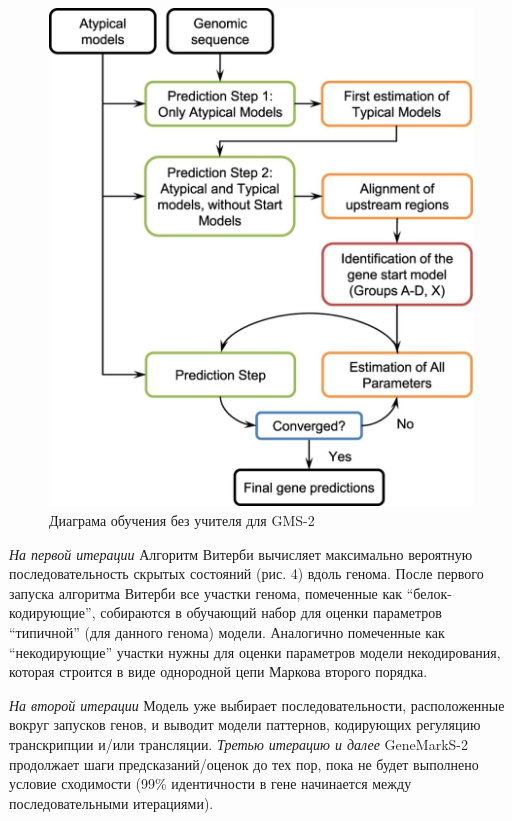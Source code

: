 \documentclass[14pt]{extarticle}
\begin{document}
    \begin{figure}[]
            \centering
            \includegraphics[width=\textwidth]{img/gms2_2.jpg}
            \caption{Диаграма обучения без учителя для GMS-2 \cite{lomsad}}
            \label{fig:skybox}
    \end{figure}
    
    
    \par{\textit{На первой итерации} Алгоритм Витерби вычисляет максимально вероятную 
    последовательность скрытых состояний (рис. 4) вдоль генома. После первого запуска
    алгоритма Витерби все участки генома, помеченные как ``белок-кодирующие'', собираются в обучающий набор для оценки 
    параметров ``типичной'' (для данного генома) модели. Аналогично помеченные как ``некодирующие'' участки нужны для 
    оценки параметров модели некодирования, которая строится в виде однородной цепи Маркова второго порядка.}
    
    
    \par{\textit{На второй итерации} Модель уже выбирает последовательности, расположенные вокруг запусков генов, 
    и выводит модели паттернов, кодирующих регуляцию транскрипции и/или трансляции. \textit{Третью итерацию и 
    далее} GeneMarkS-2 продолжает шаги предсказаний/оценок до тех пор, пока не 
    будет выполнено условие сходимости (99\% идентичности в гене начинается между последовательными итерациями).}
    
\end{document}
